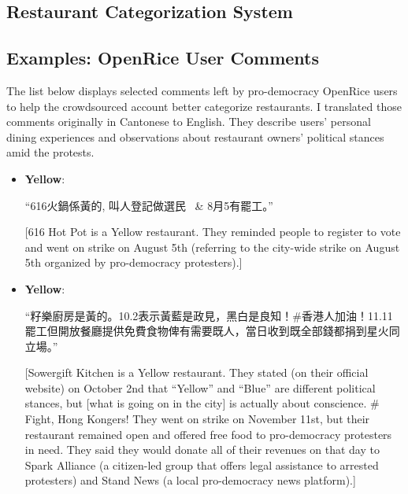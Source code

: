 \documentclass[letterpaper, 12pt]{article}
\begin{document}
\pagebreak
\begingroup
{}
\setlength\bibitemsep{6pt}
\printbibliography[heading=bibintoc]
\endgroup


\pagebreak
\begin{appendices}

\section{Restaurant Categorization System} \label{appendix:categorization_system}

\subsection{Examples: OpenRice User Comments} \label{appendix:openrice_usercomments}
The list below displays selected comments left by pro-democracy OpenRice users to help the crowdsourced account better categorize restaurants. I translated those comments originally in Cantonese to English. They describe users' personal dining experiences and observations about restaurant owners' political stances amid the protests.

\begin{itemize}
    \small
    \item \textbf{Yellow}: \begin{CJK*}{UTF8}{bkai}``616火鍋係黃的, 叫人登記做選民 ~\& 8月5有罷工。''\end{CJK*} [616 Hot Pot is a Yellow restaurant. They reminded people to register to vote and went on strike on August 5th (referring to the city-wide strike on August 5th organized by pro-democracy protesters).]
    
    \item \textbf{Yellow}: \begin{CJK*}{UTF8}{bkai}``籽樂廚房是黃的。10.2表示黃藍是政見，黑白是良知！\#香港人加油！11.11罷工但開放餐廳提供免費食物俾有需要既人，當日收到既全部錢都捐到星火同立場。''\end{CJK*} [Sowergift Kitchen is a Yellow restaurant. They stated (on their official website) on October 2nd that ``Yellow'' and ``Blue'' are different political stances, but [what is going on in the city] is actually about conscience. \# Fight, Hong Kongers! They went on strike on November 11st, but their restaurant remained open and offered free food to pro-democracy protesters in need. They said they would donate all of their revenues on that day to Spark Alliance (a citizen-led group that offers legal assistance to arrested protesters) and Stand News (a local pro-democracy news platform).]
    

\end{itemize}
\end{appendices}
\end{document}
